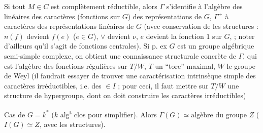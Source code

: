 Si tout $M\in C$ est complètement réductible,
alors $\Gamma$ s'identifie à l'algèbre des 
  linéaires des caractères (fonctions sur
$G$) des représentations  de $G$,
$\Gamma^+$ à   caractères des représentations linéaires
de $G$ (avec conservation de  les
structures : $n(f)$ devient $f(e)$ ($e\in G$),
$\vee$ devient $\nu$, $e$ devient la fonction $1$ sur $G$,
 ; noter d'ailleurs qu'il
s'agit de fonctions centrales). Si p. ex
$G$ est un groupe algébrique semi-simple complexe,
on obtient une connaissance structurale
concrète de $\Gamma$, qui est l'algèbre des
fonctions régulières sur $T/W$, $T$ un
``tore'' maximal, $W$ le groupe de Weyl
(il faudrait essayer de trouver une
caractérisation intrinsèque simple des
caractères irréductibles, i.e. des $\in I$ ; pour
ceci, il faut mettre sur $T/W$ une
 structure de hypergroupe, dont on
doit construire les caractères irréductibles)

Cas de $G=k^*$ ($k$ alg\textsuperscript{t} clos pour
simplifier). Alors $\Gamma(G)\simeq\text{algèbre du groupe }Z$
($I(G)\simeq Z$, avec  les structures).
